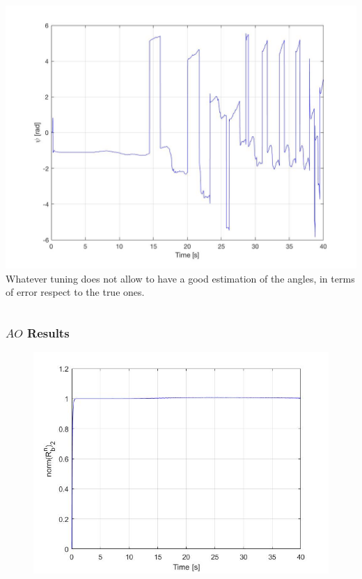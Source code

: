 \documentclass{beamer}
\begin{document}
\begin{frame}
\begin{columns}[t]
			\centering
			\includegraphics[scale= 0.12]{psi_angle.jpg}\\
			\vspace{0.4cm}
			Whatever tuning does not allow to have a good estimation of the angles, in terms of error respect to the true ones.
		\end{columns}
	\end{frame}
	

	\begin{frame}
		\frametitle{$AO$ Results}
		\begin{figure}[H]
			\includegraphics[scale=0.4]{norm_rot}
		\end{figure}
		
	\end{frame}
\end{document}
